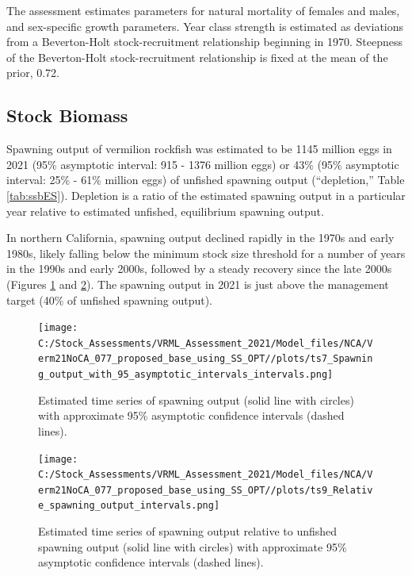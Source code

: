 \documentclass[
  english,
  a4paper,
]{article}
\begin{document}
The assessment estimates parameters for natural mortality of females and males,
and sex-specific
growth parameters. Year class strength is estimated as deviations from a Beverton-Holt stock-recruitment relationship beginning in 1970. Steepness of
the Beverton-Holt stock-recruitment relationship is fixed at the mean of the prior,
0.72.

\FloatBarrier

\hypertarget{stock-biomass}{%
\subsection*{Stock Biomass}\label{stock-biomass}}

Spawning output of vermilion rockfish was estimated to be
1145 million eggs in 2021 (95\% asymptotic interval:
915 - 1376 million eggs) or
43\%
(95\% asymptotic interval:
25\% - 61\% million eggs)
of unfished spawning output (``depletion,'' Table \ref{tab:ssbES}). Depletion
is a ratio of the estimated spawning output in a particular year relative to
estimated
unfished, equilibrium spawning output.

In northern California, spawning output declined rapidly in the 1970s and early
1980s, likely falling below the minimum stock size threshold for a number of
years in the 1990s and early 2000s, followed by a steady recovery since the
late 2000s (Figures \ref{fig:ssbES} and \ref{fig:deplES}). The spawning output
in 2021 is just above the management target (40\% of unfished spawning output).

\begin{figure}
\centering
\texttt{[image: C:/Stock\_Assessments/VRML\_Assessment\_2021/Model\_files/NCA/Verm21NoCA\_077\_proposed\_base\_using\_SS\_OPT//plots/ts7\_Spawning\_output\_with\_95\_asymptotic\_intervals\_intervals.png]}
\caption{Estimated time series of spawning output (solid line with circles) with approximate 95\% asymptotic confidence intervals (dashed lines).\label{fig:ssbES}}
\end{figure}

\begin{figure}
\centering
\texttt{[image: C:/Stock\_Assessments/VRML\_Assessment\_2021/Model\_files/NCA/Verm21NoCA\_077\_proposed\_base\_using\_SS\_OPT//plots/ts9\_Relative\_spawning\_output\_intervals.png]}
\caption{Estimated time series of spawning output relative to unfished spawning output (solid line with circles) with approximate 95\% asymptotic confidence intervals (dashed lines).\label{fig:deplES}}
\end{figure}
\end{document}

